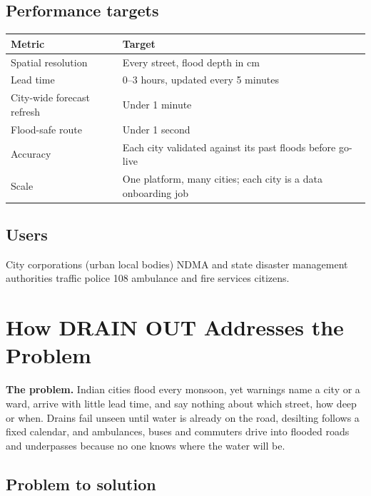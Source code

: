 \documentclass[11pt,a4paper]{article}
\begin{document}
\subsection{Performance targets}

\begin{center}
\begin{tabular}{@{}ll@{}}
\toprule
\textbf{Metric} & \textbf{Target}\\
\midrule
Spatial resolution & Every street, flood depth in cm\\
Lead time & 0--3 hours, updated every 5 minutes\\
City-wide forecast refresh & Under 1 minute\\
Flood-safe route & Under 1 second\\
Accuracy & Each city validated against its past floods before go-live\\
Scale & One platform, many cities; each city is a data onboarding job\\
\bottomrule
\end{tabular}
\end{center}

\subsection{Users}
City corporations (urban local bodies) \textperiodcentered{} NDMA and state disaster
management authorities \textperiodcentered{} traffic police \textperiodcentered{} 108
ambulance and fire services \textperiodcentered{} citizens.

\section{How DRAIN OUT Addresses the Problem}

\begin{keyline}
\textbf{The problem.} Indian cities flood every monsoon, yet warnings name a city or a
ward, arrive with little lead time, and say nothing about which street, how deep or
when. Drains fail unseen until water is already on the road, desilting follows a fixed
calendar, and ambulances, buses and commuters drive into flooded roads and underpasses
because no one knows where the water will be.
\end{keyline}

\subsection{Problem to solution}
\end{document}
